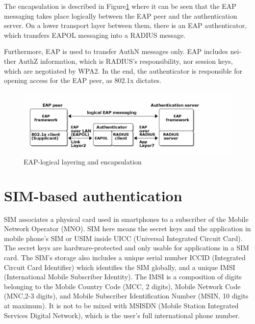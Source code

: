 \documentclass[12pt,a4paper,english]{tutthesis}
\begin{document}
\begin{otherlanguage}{english}
The encapsulation is described in Figure\ref{fig:eap-layers} where it can be
seen that the EAP messaging takes place logically between the EAP peer and
the authentication server. On a lower transport layer between them,
there is an EAP authenticator, which transfers EAPOL messaging into a
RADIUS message.

Furthermore, EAP is used to transfer AuthN messages only.
EAP includes neither AuthZ information, which is RADIUS's
responsibility, nor session keys, which are negotiated by WPA2.  In the
end,
the authenticator is  responsible for opening access for the EAP peer, as 802.1x
dictates.







\begin{figure}[htb]
\centering
\includegraphics[width=.9\linewidth]{eap-layer.png}
\caption{\label{fig:eap-layers}EAP-logical layering and encapsulation}
\end{figure}



\section{SIM-based authentication}
\label{sec-2-5}
\label{sec:sim-based-auth}
SIM associates a physical card used in smartphones to
a subscriber of the Mobile Network Operator (MNO).
SIM here means the secret keys and the application in mobile phone's
SIM or USIM inside UICC (Universal Integrated Circuit Card).
The secret keys are hardware-protected and only usable for applications
in a SIM card.
The SIM's storage also includes a unique serial number ICCID 
(Integrated Circuit Card Identifier) which identifies the SIM globally,
and a unique IMSI (International Mobile Subscriber Identity). The IMSI is
a composition of digits belonging to the Mobile Country Code (MCC, 2
digits), Mobile Network Code (MNC,2-3 digits), and Mobile Subscriber
Identification Number (MSIN, 10 digits at maximum).
It is not to be mixed with MSISDN (Mobile Station Integrated Services
Digital Network), which is the user's full international phone number.



\end{otherlanguage}
\end{document}
